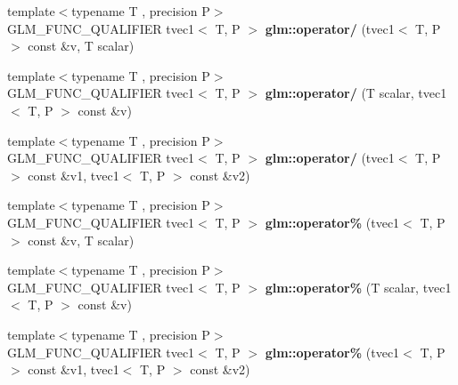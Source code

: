\begin{DoxyCompactItemize}
\mbox{\label{type__vec1_8inl_a8a223e153f2fd9909acf20517e4b0c56}} 
{\footnotesize template$<$typename T , precision P$>$ }\\G\+L\+M\+\_\+\+F\+U\+N\+C\+\_\+\+Q\+U\+A\+L\+I\+F\+I\+ER tvec1$<$ T, P $>$ {\bfseries glm\+::operator/} (tvec1$<$ T, P $>$ const \&v, T scalar)
\item 
\mbox{\label{type__vec1_8inl_adc13dc68b3d7dc9687fab144ea89519f}} 
{\footnotesize template$<$typename T , precision P$>$ }\\G\+L\+M\+\_\+\+F\+U\+N\+C\+\_\+\+Q\+U\+A\+L\+I\+F\+I\+ER tvec1$<$ T, P $>$ {\bfseries glm\+::operator/} (T scalar, tvec1$<$ T, P $>$ const \&v)
\item 
\mbox{\label{type__vec1_8inl_adfaadf561e7e396410919ec1b2d55c46}} 
{\footnotesize template$<$typename T , precision P$>$ }\\G\+L\+M\+\_\+\+F\+U\+N\+C\+\_\+\+Q\+U\+A\+L\+I\+F\+I\+ER tvec1$<$ T, P $>$ {\bfseries glm\+::operator/} (tvec1$<$ T, P $>$ const \&v1, tvec1$<$ T, P $>$ const \&v2)
\item 
\mbox{\label{type__vec1_8inl_a415cbef7b65530f60c9240859abc0f14}} 
{\footnotesize template$<$typename T , precision P$>$ }\\G\+L\+M\+\_\+\+F\+U\+N\+C\+\_\+\+Q\+U\+A\+L\+I\+F\+I\+ER tvec1$<$ T, P $>$ {\bfseries glm\+::operator\%} (tvec1$<$ T, P $>$ const \&v, T scalar)
\item 
\mbox{\label{type__vec1_8inl_ac34ec6006ae7fceb9fdfbf9d8633d2d9}} 
{\footnotesize template$<$typename T , precision P$>$ }\\G\+L\+M\+\_\+\+F\+U\+N\+C\+\_\+\+Q\+U\+A\+L\+I\+F\+I\+ER tvec1$<$ T, P $>$ {\bfseries glm\+::operator\%} (T scalar, tvec1$<$ T, P $>$ const \&v)
\item 
\mbox{\label{type__vec1_8inl_a2de72c33a685ffa2e78ebad4ae9f4e2b}} 
{\footnotesize template$<$typename T , precision P$>$ }\\G\+L\+M\+\_\+\+F\+U\+N\+C\+\_\+\+Q\+U\+A\+L\+I\+F\+I\+ER tvec1$<$ T, P $>$ {\bfseries glm\+::operator\%} (tvec1$<$ T, P $>$ const \&v1, tvec1$<$ T, P $>$ const \&v2)
\item 
\mbox{\label{type__vec1_8inl_ad2aa037fe937c769a9f08877c22e0f4a}} 

\end{DoxyCompactItemize}
